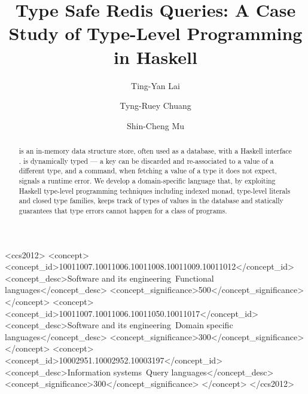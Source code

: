 \documentclass[sigplan,10pt]{acmart}
\begin{document}
\title{Type Safe Redis Queries: A Case Study of Type-Level Programming in Haskell}

\author{Ting-Yan Lai}

\author{Tyng-Ruey Chuang}

\author{Shin-Cheng Mu}

\begin{abstract}
\Redis{} is an in-memory data structure store, often used as a database, with a
Haskell interface \Hedis{}. \Redis{} is dynamically typed --- a key can be
discarded and re-associated to a value of a different type, and a command,
when fetching a value of a type it does not expect, signals a runtime error. We
develop a domain-specific language that, by exploiting Haskell type-level
programming techniques including indexed monad, type-level literals and closed
type families, keeps track of types of values in the database and statically
guarantees that type errors cannot happen for a class of \Redis{} programs.
\end{abstract}

\begin{CCSXML}
<ccs2012>
<concept>
<concept_id>10011007.10011006.10011008.10011009.10011012</concept_id>
<concept_desc>Software and its engineering~Functional languages</concept_desc>
<concept_significance>500</concept_significance>
</concept>
<concept>
<concept_id>10011007.10011006.10011050.10011017</concept_id>
<concept_desc>Software and its engineering~Domain specific languages</concept_desc>
<concept_significance>300</concept_significance>
</concept>
<concept>
<concept_id>10002951.10002952.10003197</concept_id>
<concept_desc>Information systems~Query languages</concept_desc>
<concept_significance>300</concept_significance>
</concept>
</ccs2012>
\end{CCSXML}
\end{document}
